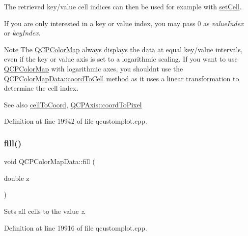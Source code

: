 The retrieved key/value cell indices can then be used for example with \hyperlink{class_q_c_p_color_map_data_a8e75eaf8746596319032a93f3d2d0683}{set\+Cell}.

If you are only interested in a key or value index, you may pass 0 as {\itshape value\+Index} or {\itshape key\+Index}.

\begin{DoxyNote}{Note}
The \hyperlink{class_q_c_p_color_map}{Q\+C\+P\+Color\+Map} always displays the data at equal key/value intervals, even if the key or value axis is set to a logarithmic scaling. If you want to use \hyperlink{class_q_c_p_color_map}{Q\+C\+P\+Color\+Map} with logarithmic axes, you shouldn\textquotesingle{}t use the \hyperlink{class_q_c_p_color_map_data_aca5b29e0ca2f299c9060fc6e1f74d0c8}{Q\+C\+P\+Color\+Map\+Data\+::coord\+To\+Cell} method as it uses a linear transformation to determine the cell index.
\end{DoxyNote}
\begin{DoxySeeAlso}{See also}
\hyperlink{class_q_c_p_color_map_data_af1a36385c78ab624cd617065602408b6}{cell\+To\+Coord}, \hyperlink{class_q_c_p_axis_af15d1b3a7f7e9b53d759d3ccff1fe4b4}{Q\+C\+P\+Axis\+::coord\+To\+Pixel} 
\end{DoxySeeAlso}


Definition at line 19942 of file qcustomplot.\+cpp.

\mbox{\label{class_q_c_p_color_map_data_a350f783260eb9b5de5c7b5e0d5d3e3c2}} 
\subsubsection{\texorpdfstring{fill()}{fill()}}
{\footnotesize\ttfamily void Q\+C\+P\+Color\+Map\+Data\+::fill (\begin{DoxyParamCaption}\item[{double}]{z }\end{DoxyParamCaption})}

Sets all cells to the value {\itshape z}. 

Definition at line 19916 of file qcustomplot.\+cpp.

\mbox{\label{class_q_c_p_color_map_data_aea88cc75a76ca571acf29b2ba8ac970d}} 
